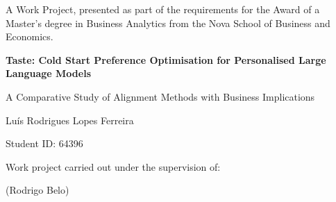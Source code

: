 \documentclass[12pt,a4paper]{article}
\begin{document}
\begin{titlepage}
\thispagestyle{empty}
\setlength{\parskip}{0.8em}

\noindent A Work Project, presented as part of the requirements for the Award of a Master's degree in Business Analytics from the Nova School of Business and Economics.

\vspace{2.5cm}

\begin{center}
{\LARGE\bfseries Taste: Cold Start Preference Optimisation for Personalised Large Language Models\par}
\vspace{0.4cm}
{\large A Comparative Study of Alignment Methods with Business Implications\par}
\end{center}

\vspace{2.5cm}

\begin{center}
{\large Lu\'is Rodrigues Lopes Ferreira\par}
{\small Student ID: 64396\par}
\end{center}

\vspace{1.2cm}

\begin{center}
Work project carried out under the supervision of:

\vspace{0.3em}
(Rodrigo Belo)
\end{center}


\end{titlepage}
\end{document}
